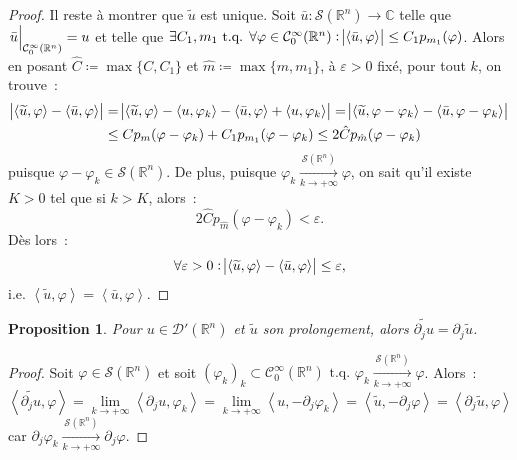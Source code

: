 \documentclass{report}
\newcommand{\C}{{\mathbb C}}
\newcommand{\R}{{\mathbb R}}
\newcommand{\scpr}[2]{\left\langle#1, #2\right\rangle}
\newcommand{\tq}{\text{ t.q. }}
\newcommand{\st}{\tq}
\newcommand{\pinfty}{{+\infty}}
\newcommand{\restr}[2]{\left.#1\vphantom{\big|}\right|_{#2}}
\newtheorem{prp}[thm]{Proposition}
\theoremstyle{definition}
\theoremstyle{remark}
\begin{document}
\begin{proof}
Il reste à montrer que $\widetilde u$ est unique. Soit $\bar u : \mathcal S(\R^n) \to \C$ telle que $\restr {\bar u}{\mathcal C^\infty_0(\R^n)} = u$ et telle que $\exists C_1, m_1 \st
\forall \varphi \in \mathcal C^\infty_0(\R^n) : \abs {\scpr {\bar u}\varphi} \leq C_1p_{m_1}(\varphi)$. Alors en posant $\hat C \coloneqq \max\{C, C_1\}$ et $\hat m \coloneqq \max\{m, m_1\}$,
à $\varepsilon > 0$ fixé, pour tout $k$, on trouve~:
\begin{align*}
	\abs {\scpr {\widetilde u}\varphi - \scpr {\bar u}\varphi} &= \abs {\scpr {\widetilde u}\varphi - \scpr u{\varphi_k} - \scpr {\bar u}\varphi + \scpr u{\varphi_k}}
	= \abs {\scpr {\widetilde u}{\varphi-\varphi_k} - \scpr {\bar u}{\varphi-\varphi_k}} \\
	&\leq Cp_m(\varphi-\varphi_k) + C_1p_{m_1}(\varphi-\varphi_k) \leq 2\hat Cp_{\hat m}(\varphi-\varphi_k)
\end{align*}
puisque $\varphi-\varphi_k \in \mathcal S(\R^n)$. De plus, puisque $\varphi_k \xrightarrow[k \to \pinfty]{\mathcal S(\R^n)} \varphi$, on sait qu'il existe $K > 0$ tel que si $k > K$,
alors~:
\[2\hat Cp_{\hat m}(\varphi - \varphi_k) < \varepsilon.\]
Dès lors~:
\[\forall \varepsilon > 0 : \abs {\scpr {\widetilde u}\varphi - \scpr {\bar u}\varphi} \leq \varepsilon,\]
i.e. $\scpr {\widetilde u}\varphi = \scpr {\bar u}\varphi$.
\end{proof}

\begin{prp}\label{prp:dérivée prolongement = prolongement dérivée} Pour $u \in \mathcal D'(\R^n)$ et $\widetilde u$ son prolongement, alors
$\widetilde {\partial_ju} = \partial_j\widetilde u$.
\end{prp}

\begin{proof}Soit $\varphi \in \mathcal S(\R^n)$ et soit $(\varphi_k)_k \subset \mathcal C^\infty_0(\R^n) \st \varphi_k \xrightarrow[k \to \pinfty]{\mathcal S(\R^n)} \varphi$. Alors~:
\[\scpr {\widetilde {\partial_ju}}\varphi = \lim_{k \to \pinfty}\scpr {\partial_ju}{\varphi_k} = \lim_{k \to \pinfty}\scpr u{-\partial_j\varphi_k}
= \scpr {\widetilde u}{-\partial_j\varphi} = \scpr {\partial_j\widetilde u}\varphi\]
car $\partial_j\varphi_k \xrightarrow[k \to \pinfty]{\mathcal S(\R^n)} \partial_j\varphi$.
\end{proof}
\end{document}

